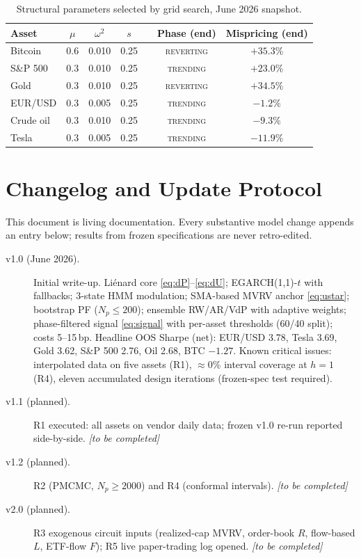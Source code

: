 \documentclass[11pt,a4paper]{article}
\begin{document}
\begin{table}[H]
\centering\small
\caption{Structural parameters selected by grid search, June 2026 snapshot.}
\begin{tabular}{lccc c cc}
\toprule
Asset & $\mu$ & $\omega^2$ & $s$ & & Phase (end) & Mispricing (end) \\
\midrule
Bitcoin & 0.6 & 0.010 & 0.25 & & \textsc{reverting} & $+35.3\%$ \\
S\&P 500 & 0.3 & 0.010 & 0.25 & & \textsc{trending} & $+23.0\%$ \\
Gold & 0.3 & 0.010 & 0.25 & & \textsc{reverting} & $+34.5\%$ \\
EUR/USD & 0.3 & 0.005 & 0.25 & & \textsc{trending} & $-1.2\%$ \\
Crude oil & 0.3 & 0.010 & 0.25 & & \textsc{trending} & $-9.3\%$ \\
Tesla & 0.3 & 0.005 & 0.25 & & \textsc{trending} & $-11.9\%$ \\
\bottomrule
\end{tabular}
\end{table}

\section{Changelog and Update Protocol}\label{app:changelog}

This document is living documentation. Every substantive model change appends an entry below; results from frozen specifications are never retro-edited.

\begin{description}
\item[v1.0 (June 2026).] Initial write-up. Li\'enard core \eqref{eq:dP}--\eqref{eq:dU}; EGARCH(1,1)-$t$ with fallbacks; 3-state HMM modulation; SMA-based MVRV anchor \eqref{eq:ustar}; bootstrap PF ($N_p \le 200$); ensemble RW/AR/VdP with adaptive weights; phase-filtered signal \eqref{eq:signal} with per-asset thresholds (60/40 split); costs 5--15\,bp. Headline OOS Sharpe (net): EUR/USD 3.78, Tesla 3.69, Gold 3.62, S\&P 500 2.76, Oil 2.68, BTC $-1.27$. Known critical issues: interpolated data on five assets (R1), $\approx$0\% interval coverage at $h{=}1$ (R4), eleven accumulated design iterations (frozen-spec test required).
\item[v1.1 (planned).] R1 executed: all assets on vendor daily data; frozen v1.0 re-run reported side-by-side. \emph{[to be completed]}
\item[v1.2 (planned).] R2 (PMCMC, $N_p \ge 2000$) and R4 (conformal intervals). \emph{[to be completed]}
\item[v2.0 (planned).] R3 exogenous circuit inputs (realized-cap MVRV, order-book $R$, flow-based $L$, ETF-flow $F$); R5 live paper-trading log opened. \emph{[to be completed]}
\end{description}
\end{document}
